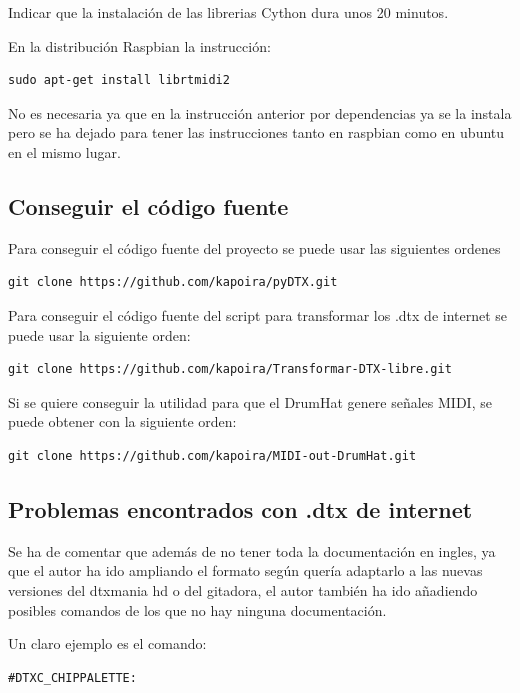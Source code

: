 \documentclass[a4paper,11pt,oneside]{book}
\begin{document}
Indicar que la instalación de las librerias Cython dura unos 20 minutos.

En la distribución Raspbian la instrucción:
\begin{Verbatim}[frame=single]
  sudo apt-get install librtmidi2   
\end{Verbatim}

No es necesaria ya que en la instrucción anterior por dependencias ya se la instala pero se ha dejado para tener las instrucciones tanto en raspbian como en ubuntu en el mismo lugar.

\subsection{Conseguir el código fuente}

Para conseguir el código fuente del proyecto se puede usar las siguientes ordenes
\begin{Verbatim}[frame=single]
    git clone https://github.com/kapoira/pyDTX.git
\end{Verbatim}


Para conseguir el código fuente del script para transformar los .dtx de internet se puede usar la siguiente orden:

\begin{Verbatim}[frame=single]
  git clone https://github.com/kapoira/Transformar-DTX-libre.git
\end{Verbatim}

Si se quiere conseguir la utilidad para que el DrumHat genere señales MIDI, se puede obtener con la siguiente orden:

\begin{Verbatim}[frame=single]
    git clone https://github.com/kapoira/MIDI-out-DrumHat.git
\end{Verbatim}

\subsection{Problemas encontrados con .dtx de internet}
Se ha de comentar que además de no tener toda la documentación en ingles, ya que el autor ha ido ampliando el formato según quería adaptarlo a las nuevas versiones del dtxmania hd o del gitadora, el autor también ha ido añadiendo posibles comandos de los que no hay ninguna documentación.

Un claro ejemplo es el comando:

\begin{Verbatim}[frame=single]
#DTXC_CHIPPALETTE: 
\end{Verbatim}
\end{document}
